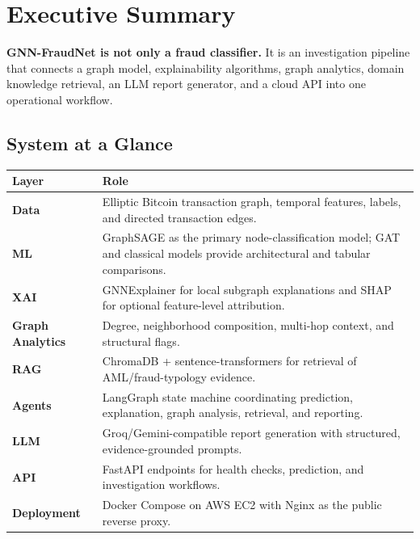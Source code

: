 \documentclass[11pt,a4paper]{report}
\begin{document}
\chapter*{Executive Summary}

\begin{tcolorbox}[colback=boxbg,colframe=darkblue,title=\textbf{What GNN-FraudNet Delivers}]
\textbf{GNN-FraudNet is not only a fraud classifier.} It is an investigation pipeline that connects a graph model, explainability algorithms, graph analytics, domain knowledge retrieval, an LLM report generator, and a cloud API into one operational workflow.
\end{tcolorbox}

\section*{System at a Glance}
\begin{center}
\begin{tabularx}{\textwidth}{>{\bfseries}l X}
\toprule
Layer & Role \\
\midrule
Data & Elliptic Bitcoin transaction graph, temporal features, labels, and directed transaction edges.\\
ML & GraphSAGE as the primary node-classification model; GAT and classical models provide architectural and tabular comparisons.\\
XAI & GNNExplainer for local subgraph explanations and SHAP for optional feature-level attribution.\\
Graph Analytics & Degree, neighborhood composition, multi-hop context, and structural flags.\\
RAG & ChromaDB + sentence-transformers for retrieval of AML/fraud-typology evidence.\\
Agents & LangGraph state machine coordinating prediction, explanation, graph analysis, retrieval, and reporting.\\
LLM & Groq/Gemini-compatible report generation with structured, evidence-grounded prompts.\\
API & FastAPI endpoints for health checks, prediction, and investigation workflows.\\
Deployment & Docker Compose on AWS EC2 with Nginx as the public reverse proxy.\\
\bottomrule
\end{tabularx}
\end{center}
\end{document}
